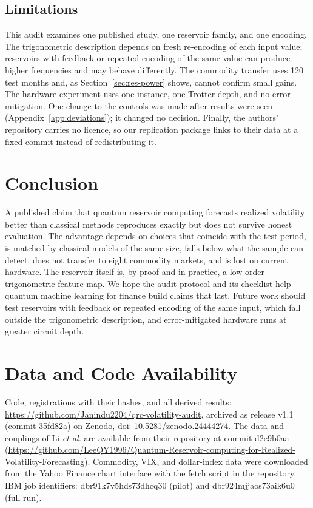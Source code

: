 \documentclass{ieeeaccess}
\begin{document}
\subsection{Limitations}
This audit examines one published study, one reservoir family, and one encoding. The trigonometric description depends on fresh re-encoding of each input value; reservoirs with feedback or repeated encoding of the same value can produce higher frequencies and may behave differently. The commodity transfer uses 120 test months and, as Section~\ref{sec:res-power} shows, cannot confirm small gains. The hardware experiment uses one instance, one Trotter depth, and no error mitigation. One change to the controls was made after results were seen (Appendix~\ref{app:deviations}); it changed no decision. Finally, the authors' repository carries no licence, so our replication package links to their data at a fixed commit instead of redistributing it.

\section{Conclusion}
\label{sec:conclusion}
A published claim that quantum reservoir computing forecasts realized volatility better than classical methods reproduces exactly but does not survive honest evaluation. The advantage depends on choices that coincide with the test period, is matched by classical models of the same size, falls below what the sample can detect, does not transfer to eight commodity markets, and is lost on current hardware. The reservoir itself is, by proof and in practice, a low-order trigonometric feature map. We hope the audit protocol and its checklist help quantum machine learning for finance build claims that last. Future work should test reservoirs with feedback or repeated encoding of the same input, which fall outside the trigonometric description, and error-mitigated hardware runs at greater circuit depth.

\section*{Data and Code Availability}
Code, registrations with their hashes, and all derived results: \url{https://github.com/Janindu2204/qrc-volatility-audit}, archived as release v1.1 (commit 35fd82a) on Zenodo, doi: 10.5281/zenodo.24444274. The data and couplings of Li \emph{et al.} are available from their repository at commit d2e9b0aa (\url{https://github.com/LeeQY1996/Quantum-Reservoir-computing-for-Realized-Volatility-Forecasting}). Commodity, VIX, and dollar-index data were downloaded from the Yahoo Finance chart interface with the fetch script in the repository. IBM job identifiers: dbr91k7v5hds73dhcq30 (pilot) and dbr924mjjaos73aik6u0 (full run).
\end{document}
